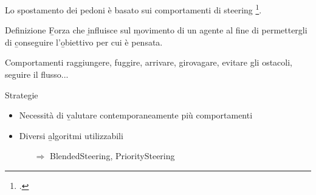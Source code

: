 Lo spostamento dei pedoni è basato sui comportamenti di steering \footcite{Reynolds1999}.

\begin{block}{Definizione}
    \b{Forza} che \b{influisce} sul \b{movimento} di un agente al fine di permettergli di \b{conseguire} l’\b{obiettivo} per cui è pensata.
\end{block}

\begin{block}{Comportamenti}
    raggiungere, fuggire, arrivare, girovagare, evitare gli ostacoli, seguire il flusso...
\end{block}

\begin{block}{Strategie}
    \begin{itemize}
        \item Necessità di \b{valutare contemporaneamente} più comportamenti
        \item Diversi \b{algoritmi} utilizzabili
        \begin{itemize}
            \item[$\Rightarrow$]BlendedSteering, PrioritySteering
        \end{itemize}
    \end{itemize}
\end{block}